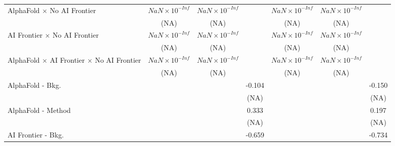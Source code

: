 \begin{tabular}{lcccccc}
   AlphaFold $\times$ No AI Frontier                                          & $NaN\times 10^{-Inf}$  & $NaN\times 10^{-Inf}$  &                        & $NaN\times 10^{-Inf}$  & $NaN\times 10^{-Inf}$  &   \\   
                                                                              & (NA)                   & (NA)                   &                        & (NA)                   & (NA)                   &   \\   
   AI Frontier $\times$ No AI Frontier                                        & $NaN\times 10^{-Inf}$  & $NaN\times 10^{-Inf}$  &                        & $NaN\times 10^{-Inf}$  & $NaN\times 10^{-Inf}$  &   \\   
                                                                              & (NA)                   & (NA)                   &                        & (NA)                   & (NA)                   &   \\   
   AlphaFold $\times$ AI Frontier $\times$ No AI Frontier                     & $NaN\times 10^{-Inf}$  & $NaN\times 10^{-Inf}$  &                        & $NaN\times 10^{-Inf}$  & $NaN\times 10^{-Inf}$  &   \\   
                                                                              & (NA)                   & (NA)                   &                        & (NA)                   & (NA)                   &   \\   
   AlphaFold - Bkg.                                                           &                        &                        & -0.104                 &                        &                        & -0.150\\   
                                                                              &                        &                        & (NA)                   &                        &                        & (NA)\\   
   AlphaFold - Method                                                         &                        &                        & 0.333                  &                        &                        & 0.197\\   
                                                                              &                        &                        & (NA)                   &                        &                        & (NA)\\   
   AI Frontier - Bkg.                                                         &                        &                        & -0.659                 &                        &                        & -0.734\\   

\end{tabular}
